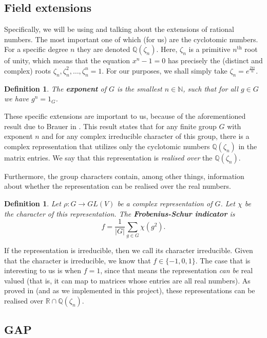 \documentclass[11pt]{article}
\newtheorem{definition}[theorem]{Definition}
\begin{document}
\subsection{Field extensions} \label{sec:extensions}

Specifically, we will be using and talking about the extensions of rational
numbers. The most important one of which (for us) are the cyclotomic numbers. For
a specific degree $n$ they are denoted $\mathbb{Q}(\zeta_n)$. Here, $\zeta_n$ is
a primitive $n^{\text{th}}$ root of unity, which means that the equation
$x^n - 1 = 0$ has precisely the (distinct and complex) roots
$\zeta_n, \zeta_n^2, \ldots, \zeta_n^n = 1$. For our purposes, we
shall simply take $\zeta_n = e^{\frac{2\pi i}{n}}$.
\begin{definition} \label{def:exponent}
  The \textbf{exponent} of $G$ is the smallest $n \in \mathbb{N}$, such that for
  all $g \in G$ we have $g^n = 1_G$.
\end{definition}

These specific extensions are important to us, because of the aforementioned
result due to Brauer in \cite[(10.3)]{ISAACS}. This result states that for any
finite group $G$ with exponent $n$ and for any complex irreducible character of
this group, there is a complex representation that utilizes only the cyclotomic
numbers $\mathbb{Q}(\zeta_n)$ in the matrix entries. We say that this
representation is \textit{realised over} the $\mathbb{Q}(\zeta_n)$.

Furthermore, the group characters contain, among other things, information about
whether the representation can be realised over the real numbers.
\begin{definition} \label{def:fsi}
  Let $\rho: G \rightarrow GL(V)$ be a complex representation of $G$. Let $\chi$ be the character
  of this representation. The \textbf{Frobenius-Schur indicator} is
  \[f = \frac{1}{\lvert G \rvert} \sum_{g \in G}\chi(g^2).\]
\end{definition}
If the representation is irreducible, then we call its character irreducible.
Given that the character is irreducible, we know that $f \in \{-1, 0, 1\}$.
The case that is interesting to us is when $f = 1$, since that means the
representation \textit{can be} real valued (that is, it can map to matrices whose
entries are all real numbers). As proved in \cite{Pas21} (and as we implemented
in this project), these representations can be realised over
$\mathbb{R} \cap \mathbb{Q}(\zeta_n)$.

\subsection{GAP}
\end{document}
